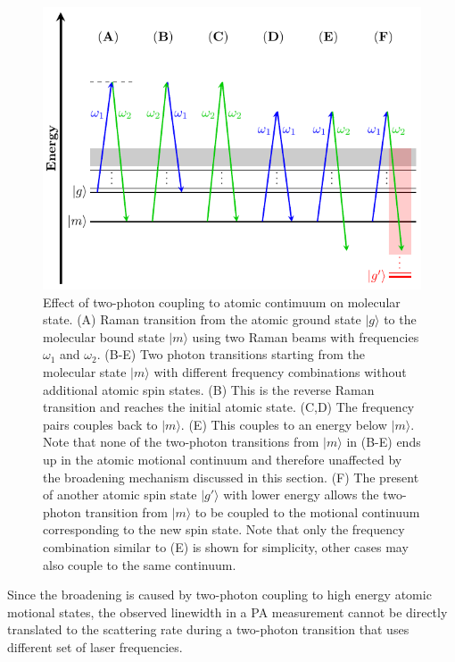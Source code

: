 \begin{figure}
  \centering
  \includegraphics[width=\textwidth]{figures/pa_two_photon_down_raman.pdf}
  \caption[Two-photon transition from molecular state.]{
    Effect of two-photon coupling to atomic contimuum on molecular state.
    (A) Raman transition from the atomic ground state $|g\rangle$
    to the molecular bound state $|m\rangle$ using two Raman beams with frequencies
    $\omega_1$ and $\omega_2$.
    (B-E) Two photon transitions starting from the molecular state $|m\rangle$
    with different frequency combinations without additional atomic spin states.
    (B) This is the reverse Raman transition and reaches the initial atomic state.
    (C,D) The frequency pairs couples back to $|m\rangle$.
    (E) This couples to an energy below $|m\rangle$.
    Note that none of the two-photon transitions from $|m\rangle$ in (B-E) ends up in
    the atomic motional continuum and therefore unaffected by the broadening mechanism
    discussed in this section.
    (F) The present of another atomic spin state $|g'\rangle$ with lower energy
    allows the two-photon transition from $|m\rangle$ to be coupled to the
    motional continuum corresponding to the new spin state.
    Note that only the frequency combination similar to (E) is shown for simplicity,
    other cases may also couple to the same continuum.
    \label{fig:pa:linewidth:two-photon-down-raman}}
\end{figure}

Since the broadening is caused by two-photon coupling to high energy atomic motional states,
the observed linewidth in a PA measurement cannot be directly translated to
the scattering rate during a two-photon transition that uses different set of laser frequencies.

